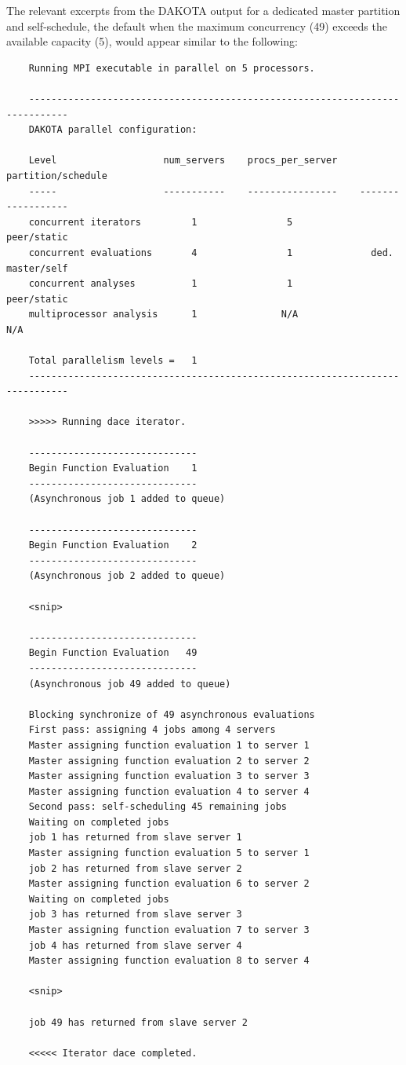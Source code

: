 The relevant excerpts from the DAKOTA output for a dedicated master
partition and self-schedule, the default when the maximum concurrency
(49) exceeds the available capacity (5), would appear similar to the
following:
\begin{small}
\begin{verbatim}
    Running MPI executable in parallel on 5 processors.

    -----------------------------------------------------------------------------
    DAKOTA parallel configuration:

    Level                   num_servers    procs_per_server    partition/schedule
    -----                   -----------    ----------------    ------------------
    concurrent iterators         1                5              peer/static
    concurrent evaluations       4                1              ded. master/self
    concurrent analyses          1                1              peer/static
    multiprocessor analysis      1               N/A                N/A

    Total parallelism levels =   1
    -----------------------------------------------------------------------------

    >>>>> Running dace iterator.

    ------------------------------
    Begin Function Evaluation    1
    ------------------------------
    (Asynchronous job 1 added to queue)

    ------------------------------
    Begin Function Evaluation    2
    ------------------------------
    (Asynchronous job 2 added to queue)

    <snip>

    ------------------------------
    Begin Function Evaluation   49
    ------------------------------
    (Asynchronous job 49 added to queue)

    Blocking synchronize of 49 asynchronous evaluations
    First pass: assigning 4 jobs among 4 servers
    Master assigning function evaluation 1 to server 1
    Master assigning function evaluation 2 to server 2
    Master assigning function evaluation 3 to server 3
    Master assigning function evaluation 4 to server 4
    Second pass: self-scheduling 45 remaining jobs
    Waiting on completed jobs
    job 1 has returned from slave server 1
    Master assigning function evaluation 5 to server 1
    job 2 has returned from slave server 2
    Master assigning function evaluation 6 to server 2
    Waiting on completed jobs
    job 3 has returned from slave server 3
    Master assigning function evaluation 7 to server 3
    job 4 has returned from slave server 4
    Master assigning function evaluation 8 to server 4

    <snip>

    job 49 has returned from slave server 2

    <<<<< Iterator dace completed.
\end{verbatim}
\end{small}
